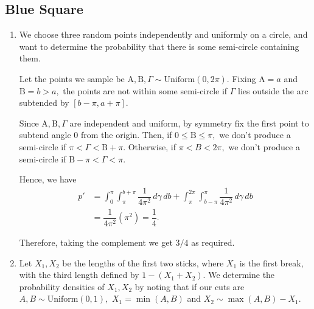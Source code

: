 \documentclass[12pt]{article}
\begin{document}
\subsection{Blue Square}
\begin{enumerate}
  \item[7] We choose three random points independently and uniformly
    on a circle, and want to determine the probability that there is
    some semi-circle containing them.

    Let the points we sample be $\mathrm A, \mathrm B, \Gamma \sim
    \text{Uniform}(0, 2 \pi).$ Fixing $\mathrm A = a$ and $\mathrm B
    = b > a,$ the points are not within some semi-circle if $\Gamma$
    lies outside the arc subtended by $[b - \pi, a + \pi].$

    Since $\mathrm A, \mathrm B, \Gamma$ are independent and uniform,
    by symmetry fix the first point to subtend angle $0$ from the
    origin. Then, if $0 \leq \mathrm B \leq \pi,$ we don't produce a
    semi-circle if $\pi < \Gamma < \mathrm B + \pi.$ Otherwise, if
    $\pi < B < 2\pi,$ we don't produce a semi-circle if $\mathrm B -
    \pi < \Gamma < \pi.$

    Hence, we have
    \begin{align*}
      p' &= \int_{0}^{\pi} \int_{\pi}^{b + \pi} \dfrac{1}{4\pi^2} \,
      d\gamma \, db + \int_{\pi}^{2\pi} \int_{b- \pi}^{\pi}
      \dfrac{1}{4\pi^2} \, d\gamma \, db \\
      &= \dfrac{1}{4\pi^2} \left(\pi^2\right) = \dfrac{1}{4}.
    \end{align*}

    Therefore, taking the complement we get $3/4$ as required.

  \item[8] Let $X_1, X_2$ be the lengths of the first two sticks,
    where $X_1$ is the first break, with the third length defined by
    $1 - (X_1 + X_2).$ We determine the probability densities of
    $X_1, X_2$ by noting that if our cuts are $A, B \sim
    \text{Uniform}(0, 1),$ $X_1 = \min(A, B)$ and $X_2 \sim \max(A, B) - X_1.$


\end{enumerate}
\end{document}
